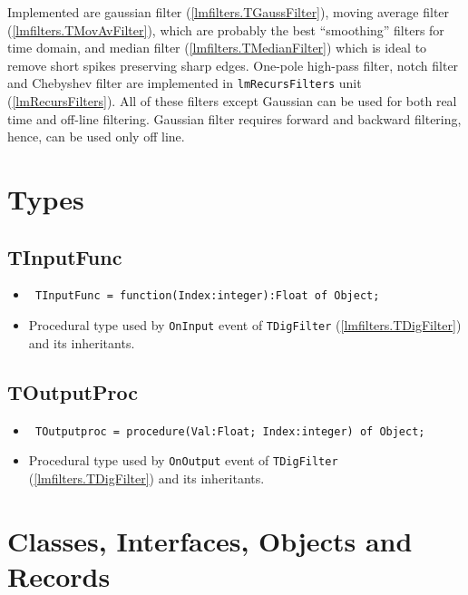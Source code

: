 \documentclass[12pt,a4paper,oneside]{report}
\newcommand{\declarationitem}[1]{{\addfontfeatures{FakeSlant} #1}}
\newcommand{\descriptiontitle}[1]{{\addfontfeatures{FakeSlant}#1}}
\newcommand{\code}[1]{\texttt{#1}}
\begin{document}
Implemented are gaussian filter (\ref{lmfilters.TGaussFilter}), moving average filter (\ref{lmfilters.TMovAvFilter}), which are probably the best ``smoothing'' filters for time domain, and median filter (\ref{lmfilters.TMedianFilter}) which is ideal to remove short spikes preserving sharp edges. One-pole high-pass filter, notch filter and Chebyshev filter are implemented in \code{lmRecursFilters} unit (\ref{lmRecursFilters}). All of these filters except Gaussian can be used for both real time and off-line filtering. Gaussian filter requires forward and backward filtering, hence, can be used only off line.

\section{Types}
\subsection{TInputFunc}
\label{lmfilters-TInputFunc}
\begin{itemize}
	\item[\declarationitem{Declaration}\hfill]
	\begin{flushleft}
		\code{
			TInputFunc = function(Index:integer):Float of Object;}
	\end{flushleft}
	\item[\descriptiontitle{Description}]
	Procedural type used by \code{OnInput} event of \code{TDigFilter} (\ref{lmfilters.TDigFilter}) and its inheritants.
\end{itemize}
\subsection{TOutputProc}
\label{lmfilters-TOutputproc}
\begin{itemize}\item[\declarationitem{Declaration}\hfill]
	\begin{flushleft}
		\code{
			TOutputproc = procedure(Val:Float; Index:integer) of Object;}
	\end{flushleft}
	\item[\descriptiontitle{Description}]
Procedural type used by \code{OnOutput} event of \code{TDigFilter} (\ref{lmfilters.TDigFilter}) and its inheritants.
\end{itemize}
\section{Classes, Interfaces, Objects and Records}
\end{document}
